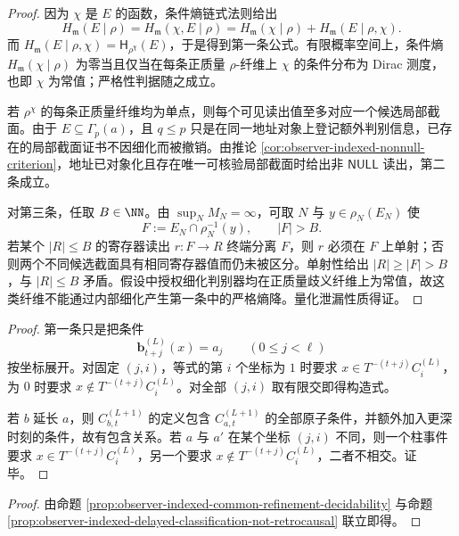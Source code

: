 \begin{proof}
因为 \(\chi\) 是 \(E\) 的函数，条件熵链式法则给出
\[
H_{\mathfrak m}(E\mid \rho)
=H_{\mathfrak m}(\chi,E\mid \rho)
=H_{\mathfrak m}(\chi\mid \rho)+H_{\mathfrak m}(E\mid \rho,\chi).
\]
而 \(H_{\mathfrak m}(E\mid \rho,\chi)=\mathsf H_{\rho^\chi}(E)\)，于是得到第一条公式。有限概率空间上，条件熵 \(H_{\mathfrak m}(\chi\mid \rho)\) 为零当且仅当在每条正质量 \(\rho\)-纤维上 \(\chi\) 的条件分布为 Dirac 测度，也即 \(\chi\) 为常值；严格性判据随之成立。

若 \(\rho^\chi\) 的每条正质量纤维均为单点，则每个可见读出值至多对应一个候选局部截面。由于 \(E\subseteq\Gamma_p(a)\)，且 \(q\le p\) 只是在同一地址对象上登记额外判别信息，已存在的局部截面证书不因细化而被撤销。由推论 \ref{cor:observer-indexed-nonnull-criterion}，地址已对象化且存在唯一可核验局部截面时给出非 \(\mathsf{NULL}\) 读出，第二条成立。

对第三条，任取 \(B\in\NN\)。由 \(\sup_N M_N=\infty\)，可取 \(N\) 与 \(y\in\rho_N(E_N)\) 使
\[
F:=E_N\cap\rho_N^{-1}(y),
\qquad |F|>B.
\]
若某个 \(|R|\le B\) 的寄存器读出 \(r:F\to R\) 终端分离 \(F\)，则 \(r\) 必须在 \(F\) 上单射；否则两个不同候选截面具有相同寄存器值而仍未被区分。单射性给出 \(|R|\ge |F|>B\)，与 \(|R|\le B\) 矛盾。假设中授权细化判别器均在正质量歧义纤维上为常值，故这类纤维不能通过内部细化产生第一条中的严格熵降。量化泄漏性质得证。
\end{proof}


\begin{proof}
第一条只是把条件
\[
\mathbf b^{(L)}_{t+j}(x)=a_j
\qquad(0\le j<\ell)
\]
按坐标展开。对固定 \((j,i)\)，等式的第 \(i\) 个坐标为 \(1\) 时要求 \(x\in T^{-(t+j)}C_i^{(L)}\)，为 \(0\) 时要求 \(x\notin T^{-(t+j)}C_i^{(L)}\)。对全部 \((j,i)\) 取有限交即得构造式。

若 \(b\) 延长 \(a\)，则 \(C^{(L+1)}_{b,t}\) 的定义包含 \(C^{(L+1)}_{a,t}\) 的全部原子条件，并额外加入更深时刻的条件，故有包含关系。若 \(a\) 与 \(a'\) 在某个坐标 \((j,i)\) 不同，则一个柱事件要求 \(x\in T^{-(t+j)}C_i^{(L)}\)，另一个要求 \(x\notin T^{-(t+j)}C_i^{(L)}\)，二者不相交。证毕。
\end{proof}

\begin{proof}
由命题 \ref{prop:observer-indexed-common-refinement-decidability} 与命题 \ref{prop:observer-indexed-delayed-classification-not-retrocausal} 联立即得。
\end{proof}


